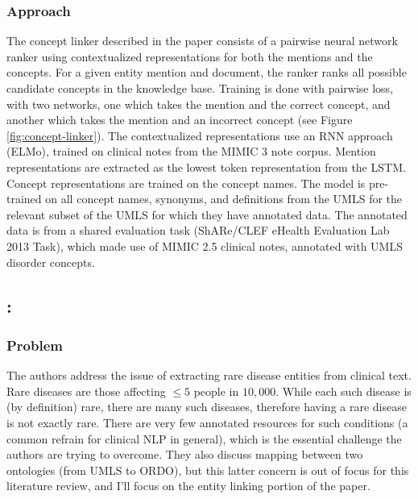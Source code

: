 \documentclass{article}
\begin{document}
\subsubsection{Approach}

The concept linker described in the paper consists of a pairwise neural network ranker using contextualized  representations for both the mentions and the concepts. For a given entity mention and document, the ranker ranks all possible candidate concepts in the knowledge base. Training is done with pairwise loss, with two networks, one which takes the mention and the correct concept, and another which takes the mention and an incorrect concept  (see Figure \ref{fig:concept-linker}). The contextualized representations use an RNN approach (ELMo), trained on clinical notes from the MIMIC 3 note corpus. Mention representations are extracted as the lowest token representation from the LSTM. Concept representations are trained on the concept names. The model is pre-trained on all concept names, synonyms, and definitions from the UMLS for the relevant subset of the UMLS for which they have annotated data. The annotated data is from a shared evaluation task (ShARe/CLEF eHealth Evaluation Lab 2013 Task), which made use of MIMIC 2.5 clinical notes, annotated with UMLS disorder concepts.


\subsection{\cite{dong_ontology-based_2022}: }

\subsubsection{Problem}

The authors address the issue of extracting rare disease entities from clinical text. Rare diseases are those affecting $\leq 5$ people in $10,000$. While each such disease is (by definition) rare, there are many such diseases, therefore having a rare disease is not exactly rare. There are very few annotated resources for such conditions (a common refrain for clinical NLP in general), which is the essential challenge the authors are trying to overcome. They also discuss mapping between two ontologies (from UMLS to ORDO), but this latter concern is out of focus for this literature review, and I'll focus on the entity linking portion of the paper.
\end{document}
